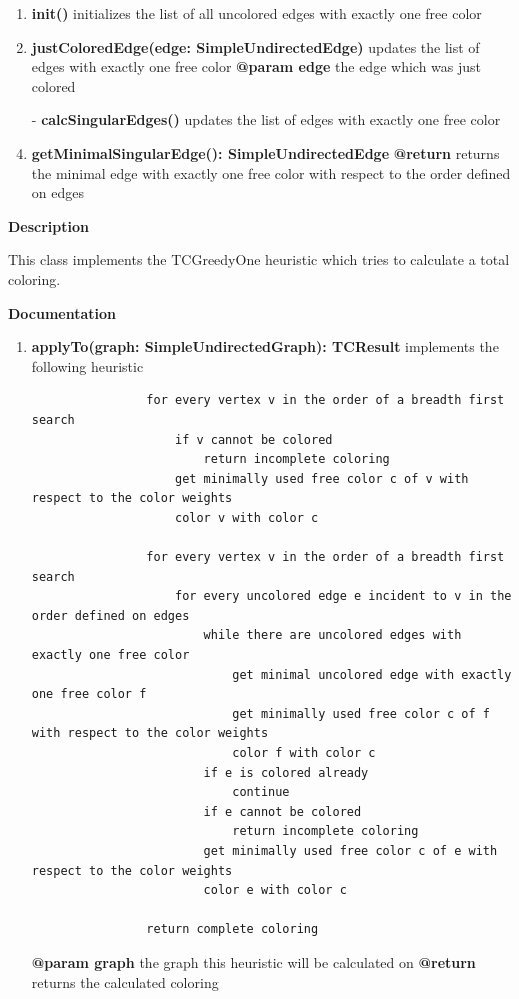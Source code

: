 	\begin{enumerate}[\#]
		\item{
			\textbf{init()} \newline
			initializes the list of all uncolored edges with exactly one free color
		}
		\item{
			\textbf{justColoredEdge(edge: SimpleUndirectedEdge)} \newline
			updates the list of edges with exactly one free color \newline
			\textbf{@param edge} the edge which was just colored
		}
		\item[-]{
			\textbf{calcSingularEdges()} \newline
			updates the list of edges with exactly one free color
		}
		\item{
			\textbf{getMinimalSingularEdge(): SimpleUndirectedEdge} \newline
			\textbf{@return} returns the minimal edge with exactly one free color with respect to the order defined on edges
		}
	\end{enumerate}
	
	
	\textbf{Description}
	
	This class implements the TCGreedyOne heuristic which tries to calculate a total coloring.
	
	\textbf{Documentation}
	
	\begin{enumerate}[+]
		\item{
			\textbf{applyTo(graph: SimpleUndirectedGraph): TCResult} \newline
			implements the following heuristic
			
			\begin{verbatim}
				for every vertex v in the order of a breadth first search
				    if v cannot be colored
				        return incomplete coloring
				    get minimally used free color c of v with respect to the color weights
				    color v with color c
				    
				for every vertex v in the order of a breadth first search
				    for every uncolored edge e incident to v in the order defined on edges
				        while there are uncolored edges with exactly one free color
				            get minimal uncolored edge with exactly one free color f
				            get minimally used free color c of f with respect to the color weights
				            color f with color c
				        if e is colored already
				            continue
				        if e cannot be colored
				            return incomplete coloring
				        get minimally used free color c of e with respect to the color weights
				        color e with color c
				        
				return complete coloring
			\end{verbatim}
			
			\textbf{@param graph} the graph this heuristic will be calculated on \newline
			\textbf{@return} returns the calculated coloring
		}
	\end{enumerate}
	
